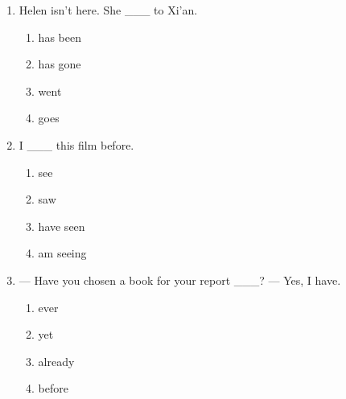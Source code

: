 \documentclass[11pt,a4paper]{ctexart}
\begin{document}
\begin{enumerate}[leftmargin=*,itemsep=4pt]
\begin{enumerate}[label=\Alph*.,leftmargin=2em,itemsep=1pt,topsep=2pt]
\item goes
\end{enumerate}
\item Helen isn’t here. She \_\_\_ to Xi’an.
\begin{enumerate}[label=\Alph*.,leftmargin=2em,itemsep=1pt,topsep=2pt]
\item has been
\item has gone
\item went
\item goes
\end{enumerate}
\item I \_\_\_ this film before.
\begin{enumerate}[label=\Alph*.,leftmargin=2em,itemsep=1pt,topsep=2pt]
\item see
\item saw
\item have seen
\item am seeing
\end{enumerate}
\item — Have you chosen a book for your report \_\_\_? — Yes, I have.
\begin{enumerate}[label=\Alph*.,leftmargin=2em,itemsep=1pt,topsep=2pt]
\item ever
\item yet
\item already
\item before
\end{enumerate}
\end{enumerate}
\end{document}
